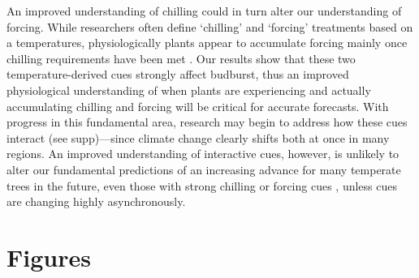 \documentclass{article}
\begin{document}

\par An improved understanding of chilling could in turn alter our understanding of forcing. While researchers often define `chilling' and `forcing' treatments based on a temperatures, physiologically plants appear to accumulate forcing mainly once chilling requirements have been met \citep{chuine2016}. Our results show that these two temperature-derived cues strongly affect budburst, thus an improved physiological understanding of when plants are experiencing and actually accumulating chilling and forcing will be critical for accurate forecasts. With progress in this fundamental area, research may begin to address how these cues interact (see supp)---since climate change clearly shifts both at once in many regions. An improved understanding of interactive cues, however, is unlikely to alter our fundamental predictions of an increasing advance for many temperate trees in the future, even those with strong chilling or forcing cues \citep{gauzere2017}, unless cues are changing highly asynchronously. 


\section* {Figures}

\newpage
\end{document}
